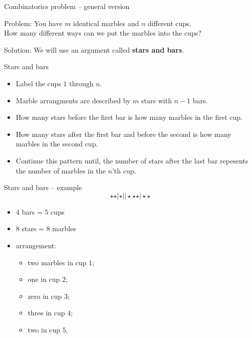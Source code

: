 \documentclass{beamer}
\begin{document}
\begin{frame}{Combinatorics problem -- general version}
  \begin{block}{Problem:}
    You have $m$ identical marbles and $n$ different cups.\\
    How many different ways can we put the marbles into the cups?
  \end{block}
\pause
  \begin{block}{Solution:}
    We will use an argument called \textbf{stars and bars}.
  \end{block}
\end{frame}

\begin{frame}{Stars and bars}
  \begin{itemize}
\pause
    \item  Label the cups $1$ through $n$.
\pause
    \item  Marble arrangments are described by $m$ stars with $n-1$ bars.
\pause
    \item  How many stars before the first bar is how many marbles in the first cup.
\pause
    \item  How many stars after the first bar and before the second is how many marbles in the second cup.
\pause
    \item  Continue this pattern until, the number of stars after the last bar repesents the number of marbles in the $n$'th cup.
  \end{itemize}
\end{frame}

\begin{frame}{Stars and bars -- example}
  $$\star\star\vert \star \vert\vert \star \star \star \vert \star \star$$
  \begin{itemize}
\pause
    \item  $4$ bars = $5$ cups\\
\pause
    \item  $8$ stars = $8$ marbles\\
\pause
    \item  arrangement:
    \begin{itemize}
      \item  two marbles in cup $1$;
      \item one in cup $2$;
      \item zero in cup $3$;
      \item three in cup $4$;
      \item two in cup $5$.
    \end{itemize}
  \end{itemize}
\end{frame}
\end{document}
